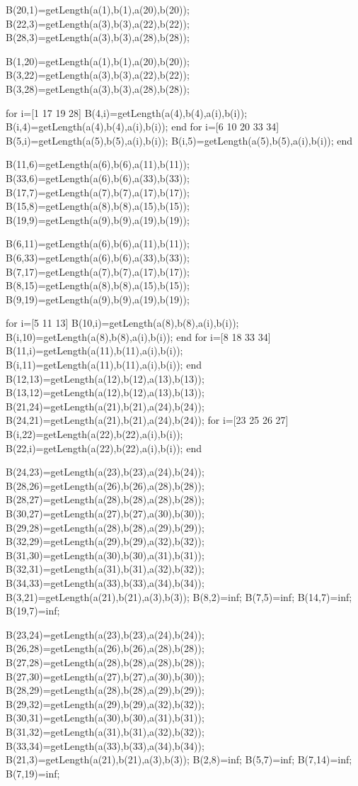 \documentclass{JXUSTmodeling}
\begin{document}
\begin{appendixx}
\begin{matlab}
B(20,1)=getLength(a(1),b(1),a(20),b(20));
B(22,3)=getLength(a(3),b(3),a(22),b(22));
B(28,3)=getLength(a(3),b(3),a(28),b(28));

B(1,20)=getLength(a(1),b(1),a(20),b(20));
B(3,22)=getLength(a(3),b(3),a(22),b(22));
B(3,28)=getLength(a(3),b(3),a(28),b(28));

for i=[1 17 19 28]
    B(4,i)=getLength(a(4),b(4),a(i),b(i));
    B(i,4)=getLength(a(4),b(4),a(i),b(i));
end
for i=[6 10 20 33 34]
    B(5,i)=getLength(a(5),b(5),a(i),b(i));
    B(i,5)=getLength(a(5),b(5),a(i),b(i));
end

B(11,6)=getLength(a(6),b(6),a(11),b(11));
B(33,6)=getLength(a(6),b(6),a(33),b(33));
B(17,7)=getLength(a(7),b(7),a(17),b(17));
B(15,8)=getLength(a(8),b(8),a(15),b(15));
B(19,9)=getLength(a(9),b(9),a(19),b(19)); 

B(6,11)=getLength(a(6),b(6),a(11),b(11));
B(6,33)=getLength(a(6),b(6),a(33),b(33));
B(7,17)=getLength(a(7),b(7),a(17),b(17));
B(8,15)=getLength(a(8),b(8),a(15),b(15));
B(9,19)=getLength(a(9),b(9),a(19),b(19)); 

for i=[5 11 13]
    B(10,i)=getLength(a(8),b(8),a(i),b(i)); 
    B(i,10)=getLength(a(8),b(8),a(i),b(i)); 
end
for i=[8 18 33 34]
    B(11,i)=getLength(a(11),b(11),a(i),b(i)); 
    B(i,11)=getLength(a(11),b(11),a(i),b(i)); 
end
B(12,13)=getLength(a(12),b(12),a(13),b(13)); 
B(13,12)=getLength(a(12),b(12),a(13),b(13)); 
B(21,24)=getLength(a(21),b(21),a(24),b(24)); 
B(24,21)=getLength(a(21),b(21),a(24),b(24)); 
for i=[23 25 26 27]
    B(i,22)=getLength(a(22),b(22),a(i),b(i)); 
    B(22,i)=getLength(a(22),b(22),a(i),b(i)); 
end

B(24,23)=getLength(a(23),b(23),a(24),b(24)); 
B(28,26)=getLength(a(26),b(26),a(28),b(28)); 
B(28,27)=getLength(a(28),b(28),a(28),b(28)); 
B(30,27)=getLength(a(27),b(27),a(30),b(30));
B(29,28)=getLength(a(28),b(28),a(29),b(29)); 
B(32,29)=getLength(a(29),b(29),a(32),b(32)); 
B(31,30)=getLength(a(30),b(30),a(31),b(31)); 
B(32,31)=getLength(a(31),b(31),a(32),b(32));
B(34,33)=getLength(a(33),b(33),a(34),b(34)); 
B(3,21)=getLength(a(21),b(21),a(3),b(3)); 
B(8,2)=inf;
B(7,5)=inf;
B(14,7)=inf;
B(19,7)=inf;



B(23,24)=getLength(a(23),b(23),a(24),b(24)); 
B(26,28)=getLength(a(26),b(26),a(28),b(28)); 
B(27,28)=getLength(a(28),b(28),a(28),b(28)); 
B(27,30)=getLength(a(27),b(27),a(30),b(30));
B(28,29)=getLength(a(28),b(28),a(29),b(29)); 
B(29,32)=getLength(a(29),b(29),a(32),b(32)); 
B(30,31)=getLength(a(30),b(30),a(31),b(31)); 
B(31,32)=getLength(a(31),b(31),a(32),b(32));
B(33,34)=getLength(a(33),b(33),a(34),b(34)); 
B(21,3)=getLength(a(21),b(21),a(3),b(3)); 
B(2,8)=inf;
B(5,7)=inf;
B(7,14)=inf;
B(7,19)=inf;



\end{matlab}
\end{appendixx}
\end{document}
